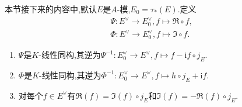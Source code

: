 本节接下来的内容中,默认$E$是$A$-模,$E_{0}=\tau_{\ast}\left(E\right)$.定义
\begin{gather*}
	\Psi:E^{\vee}\to E_{0}^{\vee},f\mapsto\Re\circ f,\\
	\Phi:E^{\vee}\to E_{0}^{\vee},f\mapsto\Im\circ f.
\end{gather*}

\begin{proposition}{}{}
	\begin{enumerate}
		\item $\Psi$是$K$-线性同构,其逆为$\Psi^{-1}:E_{0}^{\vee}\to E^{\vee},f\mapsto f-\mathrm{i}f\circ j_{E}$.
		\item $\Phi$是$K$-线性同构,其逆为$\Phi^{-1}:E_{0}^{\vee}\to E^{\vee},f\mapsto h\circ j_{E}+\mathrm{i}f$.
		\item 对每个$f\in E^{\vee}$有$\Re\left(f\right)=\Im\left(f\right)\circ j_{E}$和$\Im\left(f\right)=-\Re\left(f\right)\circ j_{E}$.
	\end{enumerate}
\end{proposition}



